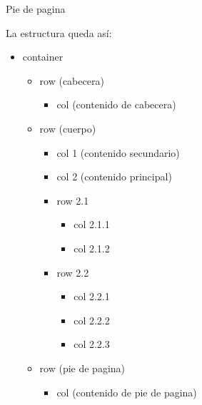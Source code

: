\documentclass[letterpaper,10pt,spanish]{sphinxmanual}
\begin{document}
\begin{sphinxVerbatim}[commandchars=\\\{\}]
  
   
   Pie de pagina
\end{sphinxVerbatim}



La estructura queda así:
\begin{itemize}
\item {} 
container
\begin{itemize}
\item {} 
row (cabecera)
\begin{itemize}
\item {} 
col (contenido de cabecera)

\end{itemize}

\item {} 
row (cuerpo)
\begin{itemize}
\item {} 
col 1 (contenido secundario)

\item {} 
col 2 (contenido principal)

\end{itemize}
\begin{itemize}
\item {} 
row 2.1
\begin{itemize}
\item {} 
col 2.1.1

\item {} 
col 2.1.2

\end{itemize}

\item {} 
row 2.2
\begin{itemize}
\item {} 
col 2.2.1

\item {} 
col 2.2.2

\item {} 
col 2.2.3

\end{itemize}

\end{itemize}

\item {} 
row (pie de pagina)
\begin{itemize}
\item {} 
col (contenido de pie de pagina)

\end{itemize}

\end{itemize}

\end{itemize}
\end{document}
